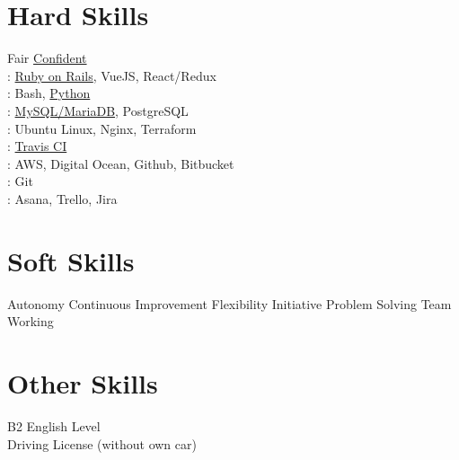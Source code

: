 \documentclass[]{deedy-resume-openfont}
\begin{document}
\begin{minipage}[t]{0.33\textwidth}
\section{Hard Skills}
Fair \textbullet{} \underline{Confident}\\
: \underline{Ruby on Rails}, VueJS, React/Redux\\
: Bash, \underline{Python} \\
: \underline{MySQL/MariaDB}, PostgreSQL \\
: Ubuntu Linux, Nginx, Terraform\\
: \underline{Travis CI}\\
: AWS, Digital Ocean, Github, Bitbucket \\
: Git\\
: Asana, Trello, Jira

\section{Soft Skills}
Autonomy \textbullet{} Continuous Improvement \textbullet{} Flexibility \textbullet{}
Initiative \textbullet{} Problem Solving \textbullet{} Team Working
\sectionsep
\section{Other Skills}
B2 English Level \\
Driving License (without own car)
\sectionsep

%
%

\end{minipage} 
\vline
\hspace{0.01\textwidth}
\end{document}
